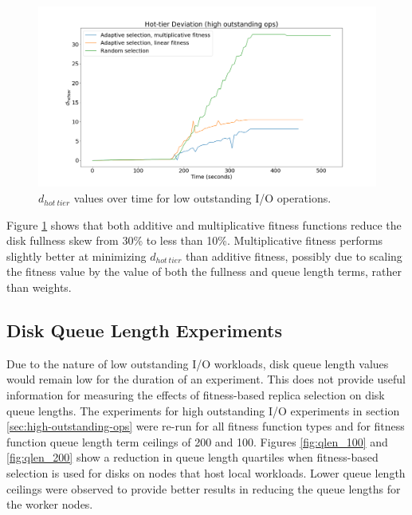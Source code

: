 \documentclass[12pt]{article}
\begin{document}
    \begin{figure}[htbp]
      \centering
      \includegraphics[scale=0.32]{images/high_outstanding_exp.png} 
      \caption{$d_{hot\ tier}$ values over time for low outstanding I/O
               operations.}
      \label{fig:high_outstanding_tier_disparity}
    \end{figure}


    Figure \ref{fig:high_outstanding_tier_disparity} shows that both additive
    and multiplicative fitness functions reduce the disk fullness skew from
    30\% to less than 10\%. Multiplicative fitness performs slightly better at
    minimizing $d_{hot\ tier}$ than additive fitness, possibly due to scaling
    the fitness value by the value of both the fullness and queue length terms,
    rather than weights.
  
  \subsection{Disk Queue Length Experiments} \label{experiments-qlen}

  Due to the nature of low outstanding I/O workloads, disk queue length values
  would remain low for the duration of an experiment. This does not provide
  useful information for measuring the effects of fitness-based replica
  selection on disk queue lengths. The experiments for high outstanding I/O
  experiments in section \ref{sec:high-outstanding-ops} were re-run for all
  fitness function types and for fitness function queue length term ceilings of
  200 and 100. Figures \ref{fig:qlen_100} and \ref{fig:qlen_200} show a
  reduction in queue length quartiles when fitness-based selection is used for
  disks on nodes that host local workloads. Lower queue length ceilings were
  observed to provide better results in reducing the queue lengths for the
  worker nodes.
\end{document}
